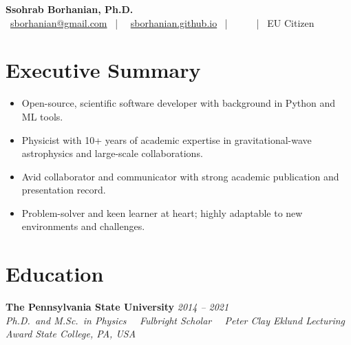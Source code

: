 \documentclass[10pt, a4paper]{article}
\makeatletter
\newcommand{\cventry}[4]{%
  \textbf{#1}                      \hfill {\color{muted}\small\textit{#4}} \\[2pt]
  {\color{muted}\small\textit{#2}} \hfill {\color{muted}\small\textit{#3}}
}
\newcommand{\tpc}{\textperiodcentered}
\makeatother
\begin{document}

\begin{center}
  {\Huge\bfseries Ssohrab Borhanian, Ph.D.}\\[3pt]
  {\small\color{muted}
    \faEnvelope~\href{mailto:sborhanian@gmail.com}{sborhanian@gmail.com}
    ~|~
    \faGlobe~\href{https://sborhanian.github.io/}{sborhanian.github.io}
    ~|~
    \href{https://www.linkedin.com/in/ssohrab-borhanian}{\faLinkedin}
    ~
    \href{https://github.com/sborhanian} {\faGithub}
    ~
    \href{https://gitlab.com/sborhanian} {\faGitlab}
    ~|~
    EU Citizen
  }
\end{center}

\vspace{1pt}

\section{Executive Summary}
\begin{itemize}
  \item Open-source, scientific software developer with background in Python and ML tools.
  \item Physicist with 10+ years of academic expertise in gravitational-wave astrophysics and large-scale collaborations.
  \item Avid collaborator and communicator with strong academic publication and presentation record.
  \item Problem-solver and keen learner at heart; highly adaptable to new environments and challenges.
\end{itemize}

\section{Education}

\cventry%
  {The Pennsylvania State University }%
  {Ph.D.\ and M.Sc.\ in Physics~\tpc~ Fulbright Scholar~\tpc~ Peter Clay Eklund Lecturing Award}%
  {State College, PA, USA}%
  {2014 -- 2021}
\end{document}
